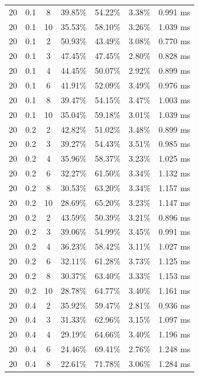 \documentclass[11pt,a4paper]{article}
\begin{document}
\begin{longtable}{ccccccc}
        20 & 0.1 & 8 & 39.85\% & 54.22\% & 3.38\% & 0.991 ms \\
        20 & 0.1 & 10 & 35.53\% & 58.10\% & 3.26\% & 1.039 ms \\
        20 & 0.1 & 2 & 50.93\% & 43.49\% & 3.08\% & 0.770 ms \\
        20 & 0.1 & 3 & 47.45\% & 47.45\% & 2.80\% & 0.828 ms \\
        20 & 0.1 & 4 & 44.45\% & 50.07\% & 2.92\% & 0.899 ms \\
        20 & 0.1 & 6 & 41.91\% & 52.09\% & 3.49\% & 0.976 ms \\
        20 & 0.1 & 8 & 39.47\% & 54.15\% & 3.47\% & 1.003 ms \\
        20 & 0.1 & 10 & 35.04\% & 59.18\% & 3.01\% & 1.039 ms \\
        \midrule   
        20 & 0.2 & 2 & 42.82\% & 51.02\% & 3.48\% & 0.899 ms \\
        20 & 0.2 & 3 & 39.27\% & 54.43\% & 3.51\% & 0.985 ms \\
        20 & 0.2 & 4 & 35.96\% & 58.37\% & 3.23\% & 1.025 ms \\
        20 & 0.2 & 6 & 32.27\% & 61.50\% & 3.34\% & 1.132 ms \\
        20 & 0.2 & 8 & 30.53\% & 63.20\% & 3.34\% & 1.157 ms \\
        20 & 0.2 & 10 & 28.69\% & 65.20\% & 3.23\% & 1.147 ms \\
        20 & 0.2 & 2 & 43.59\% & 50.39\% & 3.21\% & 0.896 ms \\
        20 & 0.2 & 3 & 39.06\% & 54.99\% & 3.45\% & 0.991 ms \\
        20 & 0.2 & 4 & 36.23\% & 58.42\% & 3.11\% & 1.027 ms \\
        20 & 0.2 & 6 & 32.11\% & 61.28\% & 3.73\% & 1.125 ms \\
        20 & 0.2 & 8 & 30.37\% & 63.40\% & 3.33\% & 1.153 ms \\
        20 & 0.2 & 10 & 28.78\% & 64.77\% & 3.40\% & 1.161 ms \\
        \midrule
        20 & 0.4 & 2 & 35.92\% & 59.47\% & 2.81\% & 0.936 ms \\
        20 & 0.4 & 3 & 31.33\% & 62.96\% & 3.15\% & 1.097 ms \\
        20 & 0.4 & 4 & 29.19\% & 64.66\% & 3.40\% & 1.196 ms \\
        20 & 0.4 & 6 & 24.46\% & 69.41\% & 2.76\% & 1.248 ms \\
        20 & 0.4 & 8 & 22.61\% & 71.78\% & 3.06\% & 1.284 ms \\

\end{longtable}
\end{document}
